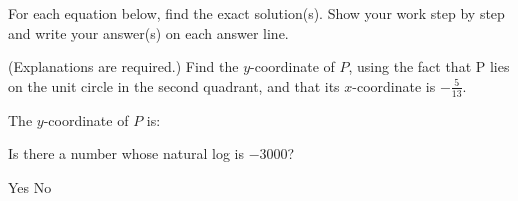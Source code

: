 \documentclass[11pt,answers]{exam}
\begin{document}

\begin{questions}


\addpoints

        
\question  For each equation below, find the exact solution(s). Show your work step by step and write your answer(s) on each answer line.


\question[2] (Explanations are required.) Find the $y$-coordinate of $P$, using the fact that P lies on the unit circle in the second quadrant, and that its $x$-coordinate is $\displaystyle -\frac{5}{13}$.

\fillwithdottedlines{0.8in}

The $y$-coordinate of $P$ is:\dotfill

\bonusquestion[1] Is there a number whose natural log is $-3000$?
\begin{oneparchoices}
\choice Yes \choice No
\end{oneparchoices}


\end{questions}
\end{document}
